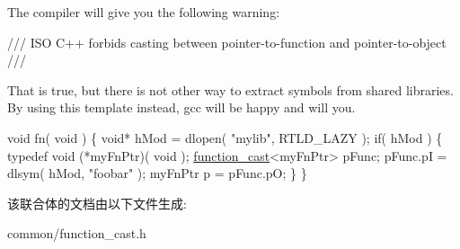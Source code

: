 The compiler will give you the following warning\+:

\begin{DoxyVerb}/// ISO C++ forbids casting between pointer-to-function and pointer-to-object
/// \end{DoxyVerb}
 \begin{DoxyVerb}That is true, but there is not other way to extract symbols from shared libraries.
By using this template instead, gcc will be happy and will you.
\end{DoxyVerb}



\begin{DoxyCode}
\textcolor{keywordtype}{void} fn( \textcolor{keywordtype}{void} )
\{
  \textcolor{keywordtype}{void}* hMod = dlopen( \textcolor{stringliteral}{"mylib"}, RTLD\_LAZY );
  \textcolor{keywordflow}{if}( hMod )
  \{
    \textcolor{keyword}{typedef} void (*myFnPtr)( void );
    \hyperlink{unionfunction__cast}{function\_cast}<myFnPtr> pFunc;
    pFunc.pI = dlsym( hMod, \textcolor{stringliteral}{"foobar"} );
    myFnPtr p = pFunc.pO;
  \}
\}
\end{DoxyCode}
 

该联合体的文档由以下文件生成\+:\begin{DoxyCompactItemize}
\item 
common/function\+\_\+cast.\+h\end{DoxyCompactItemize}
